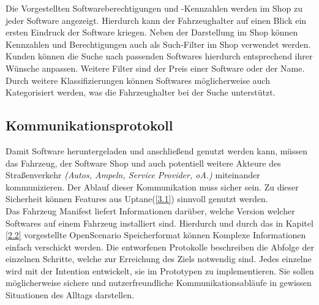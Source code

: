 Die Vorgestellten Softwareberechtigungen und -Kennzahlen werden im Shop zu jeder Software angezeigt. Hierdurch kann der Fahrzeughalter auf einen Blick ein ersten Eindruck der Software kriegen. Neben der Darstellung im Shop können Kennzahlen und Berechtigungen auch als Such-Filter im Shop verwendet werden. Kunden können die Suche nach passenden Softwares hierdurch entsprechend ihrer Wünsche anpassen. Weitere Filter sind der Preis einer Software oder der Name. Durch weitere Klassifizierungen können Softwares möglicherweise auch Kategorisiert werden, was die Fahrzeughalter bei der Suche unterstützt.

\subsection{Kommunikationsprotokoll}\label{4.2}
Damit Software heruntergeladen und anschließend genutzt werden kann, müssen das Fahrzeug, der Software Shop und auch potentiell weitere Akteure des Straßenverkehr \textit{(Autos, Ampeln, Service Provider, oA.)} miteinander kommunizieren. Der Ablauf dieser Kommunikation muss sicher sein. Zu dieser Sicherheit können Features aus Uptane(\ref{3.1}) sinnvoll genutzt werden.\\
Das Fahrzeug Manifest liefert Informationen darüber, welche Version welcher Softwares auf einem Fahrzeug installiert sind. Hierdurch und durch das in Kapitel \ref{2.2} vorgestellte OpenScenario Speicherformat können Komplexe Informationen einfach verschickt werden. Die entworfenen Protokolle beschreiben die Abfolge der einzelnen Schritte, welche zur Erreichung des Ziels notwendig sind. Jedes einzelne wird mit der Intention entwickelt, sie im Prototypen zu implementieren. Sie sollen möglicherweise sichere und nutzerfreundliche Kommunikationsabläufe in gewissen Situationen des Alltags darstellen.

